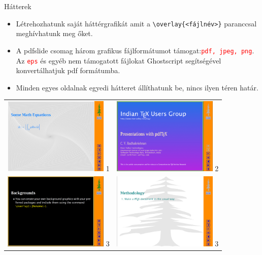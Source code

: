 \documentclass{beamer}
\begin{document}
\begin{frame}[fragile]{Hátterek}
\begin{itemize}
\item Létrehozhatunk saját háttérgrafikát amit a \color{red}\verb|\overlay{<fájlnév>}|\color{black} paranccsal meghívhatunk meg őket.
\pause

\item A pdfslide csomag három grafikus fájlformátumot támogat:\textcolor{red}{\tt pdf, jpeg, png}. Az \textcolor{red}{\tt eps} és egyéb nem támogatott fájlokat Ghostscript segítségével konvertálhatjuk pdf formátumba.
\pause

\item Minden egyes oldalnak egyedi hátteret állíthatunk be, nincs ilyen téren
határ.


\end{itemize}
\end{frame}
\begin{frame}
\begin{tabular}{cc}
\includegraphics[width=5cm]{egyen1} 1 & \includegraphics[width=5cm]{hatter1} 2 \\
\includegraphics[width=5cm]{hatter2} 3 & \includegraphics[width=5cm]{hatter3} 3 \\ 
\end{tabular}
\end{frame}
\end{document}
